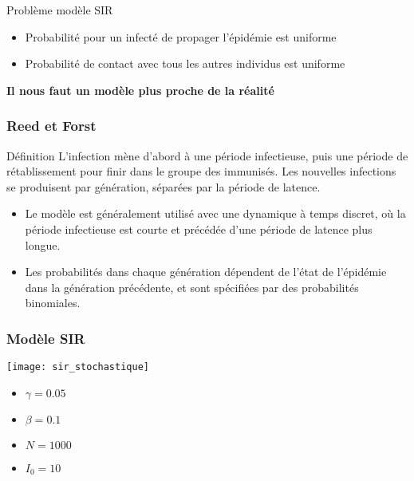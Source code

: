 \begin{frame}
    \begin{block}{Problème modèle SIR}
        \begin{itemize}
            \item Probabilité pour un infecté de propager l'épidémie est uniforme
            \item Probabilité de contact avec tous les autres individus est uniforme
        \end{itemize}
    \end{block}

    \begin{center}
        \bf Il nous faut un modèle plus proche de la réalité
    \end{center}
\end{frame}


\begin{frame}
    \frametitle{Reed et Forst}

    \begin{block}{Définition}
        L'infection mène d'abord à une période infectieuse, puis une période de rétablissement pour finir dans le groupe des immunisés. Les nouvelles infections se produisent par génération, séparées par la période de latence.
    \end{block}

    \begin{itemize}
        \item Le modèle est généralement utilisé avec une dynamique à temps discret, où la période infectieuse est courte et précédée d’une période de latence plus longue.
        \item Les probabilités dans chaque génération dépendent de l’état de l’épidémie dans la génération précédente, et sont spécifiées par des probabilités binomiales.
    \end{itemize}
\end{frame}

\begin{frame}
        \frametitle{Modèle SIR}

        \centering
        \texttt{[image: sir\_stochastique]}

        \begin{multicols}{2}
            \begin{itemize}
                    \item $\gamma = 0.05$
                    \item $\beta = 0.1$
                    \item $N = 1000$
                    \item $I_0 = 10$
            \end{itemize}
        \end{multicols}

\end{frame}

